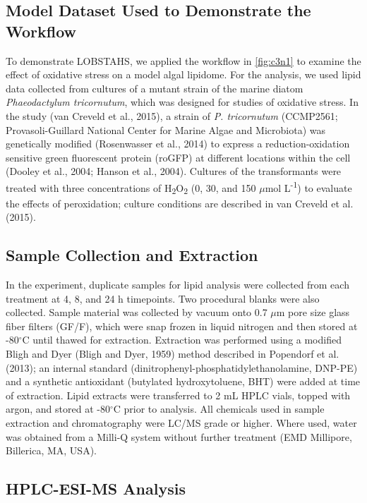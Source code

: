 \subsection{Model Dataset Used to Demonstrate the Workflow}

To demonstrate LOBSTAHS, we applied the workflow in \autoref{fig:c3n1} to examine the effect of oxidative stress on a model algal lipidome. For the analysis, we used lipid data collected from cultures of a mutant strain of the marine diatom \emph{Phaeodactylum tricornutum}, which was designed for studies of oxidative stress. In the study (van Creveld et al., 2015), a strain of \emph{P. tricornutum} (CCMP2561; Provasoli-Guillard National Center for Marine Algae and Microbiota) was genetically modified (Rosenwasser et al., 2014) to express a reduction-oxidation sensitive green fluorescent protein (roGFP) at different locations within the cell (Dooley et al., 2004; Hanson et al., 2004). Cultures of the transformants were treated with three concentrations of H\textsubscript{2}O\textsubscript{2} (0, 30, and 150 $\mu$mol L\textsuperscript{-1}) to evaluate the effects of peroxidation; culture conditions are described in van Creveld et al. (2015).

\subsection{Sample Collection and Extraction}

In the experiment, duplicate samples for lipid analysis were collected from each treatment at 4, 8, and 24 h timepoints. Two procedural blanks were also collected. Sample material was collected by vacuum onto 0.7 $\mu$m pore size glass fiber filters (GF/F), which were snap frozen in liquid nitrogen and then stored at -80$^{\circ}$C until thawed for extraction. Extraction was performed using a modified Bligh and Dyer (Bligh and Dyer, 1959) method described in Popendorf et al. (2013); an internal standard (dinitrophenyl-phosphatidylethanolamine, DNP-PE) and a synthetic antioxidant (butylated hydroxytoluene, BHT) were added at time of extraction. Lipid extracts were transferred to 2 mL HPLC vials, topped with argon, and stored at -80$^{\circ}$C prior to analysis. All chemicals used in sample extraction and chromatography were LC/MS grade or higher. Where used, water was obtained from a Milli-Q system without further treatment (EMD Millipore, Billerica, MA, USA).

\subsection{HPLC-ESI-MS Analysis}

